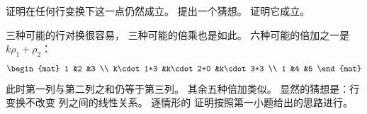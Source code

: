 \begin{exercises}
\begin{exparts}
      \partsitem 证明在任何行变换下这一点仍然成立。
      \partsitem 提出一个猜想。
      \partsitem 证明它成立。
    \end{exparts}
    \begin{answer}
      \begin{exparts}
        \partsitem 三种可能的行对换很容易， 
          三种可能的倍乘也是如此。
          六种可能的倍加之一是 \( k\rho_1+\rho_2 \)：
          \begin{equation*}
            \begin{mat}
              1           &2           &3  \\
              k\cdot 1+3  &k\cdot 2+0  &k\cdot 3+3  \\
              1           &4           &5
            \end{mat}
          \end{equation*}
          此时第一列与第二列之和仍等于第三列。
          其余五种倍加类似。
        \partsitem 显然的猜想是：行变换不改变
          列之间的线性关系。
        \partsitem 逐情形的
          证明按照第一小题给出的思路进行。
      \end{exparts}  
   \end{answer}
\end{exercises}
